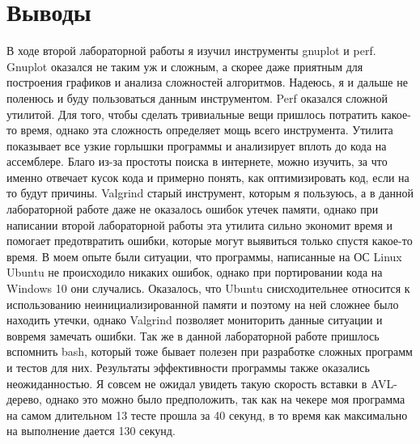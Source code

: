 
\section{Выводы}
В ходе второй лабораторной работы я изучил инструменты gnuplot и perf. Gnuplot оказался не таким уж и сложным, а скорее даже приятным для построения графиков и анализа 
сложностей алгоритмов. Надеюсь, я и дальше не поленюсь и буду пользоваться данным инструментом. Perf оказался сложной утилитой. Для того, чтобы сделать тривиальные вещи
пришлось потратить какое-то время, однако эта сложность определяет мощь всего инструмента. Утилита показывает все узкие горлышки программы и анализирует вплоть до кода на
ассемблере. Благо из-за простоты поиска в интернете, можно изучить, за что именно отвечает кусок кода и примерно понять, как оптимизировать код, если на то будут причины.
Valgrind старый инструмент, которым я пользуюсь, а в данной лабораторной работе даже не оказалось ошибок утечек памяти, однако при написании второй лабораторной работы эта 
утилита сильно экономит время и помогает предотвратить ошибки, которые могут выявиться только спустя какое-то время. В моем опыте были ситуации, что программы, написанные
на ОС Linux Ubuntu не происходило никаких ошибок, однако при портировании кода на Windows 10 они случались. Оказалось, что Ubuntu снисходительнее относится к использованию
неинициализированной памяти и поэтому на ней сложнее было находить утечки, однако Valgrind позволяет мониторить данные ситуации и вовремя замечать ошибки. Так же в данной
лабораторной работе пришлось вспомнить bash, который тоже бывает полезен при разработке сложных программ и тестов для них. Результаты эффективности программы также оказались
неожиданностью. Я совсем не ожидал увидеть такую скорость вставки в AVL-дерево, однако это можно было предположить, так как на чекере моя программа на самом длительном 13 
тесте прошла за 40 секунд, в то время как максимально на выполнение дается 130 секунд. 
\pagebreak

